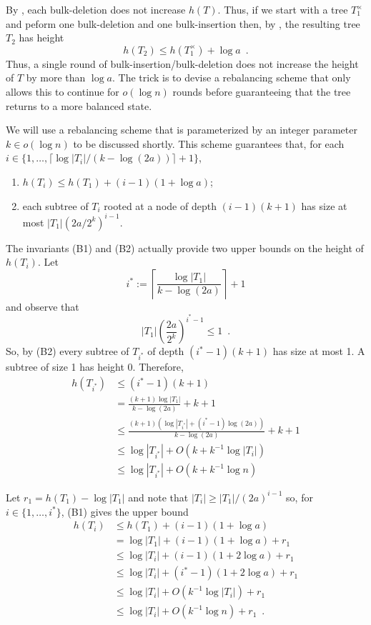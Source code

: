 \documentclass[kpfonts]{patmorin}
\begin{document}
By , each bulk-deletion does not increase $h(T)$.  Thus, if we start with a tree $T_1^\times$ and peform one bulk-deletion and one bulk-insertion then, 
by , the resulting tree $T_2$ has height
\[
   h(T_2) \le h(T_1^\times)+\log a \enspace .
\]
Thus, a single round of bulk-insertion/bulk-deletion does not increase the height of $T$ by more than $\log a$.  The trick is to devise a rebalancing scheme that only allows this to continue for $o(\log n)$ rounds before guaranteeing that the tree returns to a more balanced state.

We will use a rebalancing scheme that is parameterized by an integer parameter $k\in o(\log n)$ to be discussed shortly.  This scheme guarantees that, for each $i\in\{1,\ldots,\lceil\log|T_i|/(k-\log(2a))\rceil+1\}$, 
\begin{enumerate}[(B1)]
  \item $h(T_i)\le h(T_1) + (i-1)(1+\log a)$;
  \item each subtree of $T_i$ rooted at a node of depth $(i-1)(k+1)$ has size at most $|T_1|(2a/2^k)^{i-1}$.
\end{enumerate}

The invariants (B1) and (B2) actually provide two upper bounds on the height of $h(T_i)$.  Let
\[
   i^* := \left\lceil \frac{\log|T_1|}{k-\log(2a)}\right\rceil + 1
\]
and observe that
\[
   |T_{1}|\left(\frac{2a}{2^k}\right)^{i^*-1} \le 1 \enspace .
\]
So, by (B2) every subtree of $T_{i^*}$ of depth $(i^*-1)(k+1)$ has size at most 1.  A subtree of size 1 has height 0.  Therefore,
\begin{align*}
  h(T_{i^*}) & \le (i^*-1)(k+1) \\
  & = \frac{(k+1)\log|T_1|}{k-\log(2a)} + k+1 \\
  & \le \frac{(k+1)(\log |T_{i^*}| + (i^*-1)\log(2a))}{k-\log(2a)} + k+1 \\
  & \le \log|T_{i^*}| + O(k + k^{-1}\log |T_i|) \\
  & \le \log |T_{i^*}| + O(k + k^{-1}\log n)
\end{align*}

Let $r_1=h(T_1)-\log |T_1|$ and note that $|T_i|\ge |T_1|/(2a)^{i-1}$ so, for $i\in\{1,\ldots,i^*\}$, (B1) gives the upper bound
\begin{align}
     h(T_i) & \le h(T_1) + (i-1)(1+\log a) \nonumber \\
            &= \log|T_1| + (i-1)(1+\log a) + r_1 \nonumber \\
            &\le \log |T_i| + (i-1)(1+2\log a) + r_1 \nonumber \\
            &\le \log |T_i| + (i^*-1)(1+2\log a) + r_1 \nonumber \\
            &\le \log |T_i| + O(k^{-1}\log|T_i|) + r_1 \nonumber \\
            &\le \log |T_i| + O(k^{-1}\log n) + r_1 \enspace .
\end{align}
\end{document}
